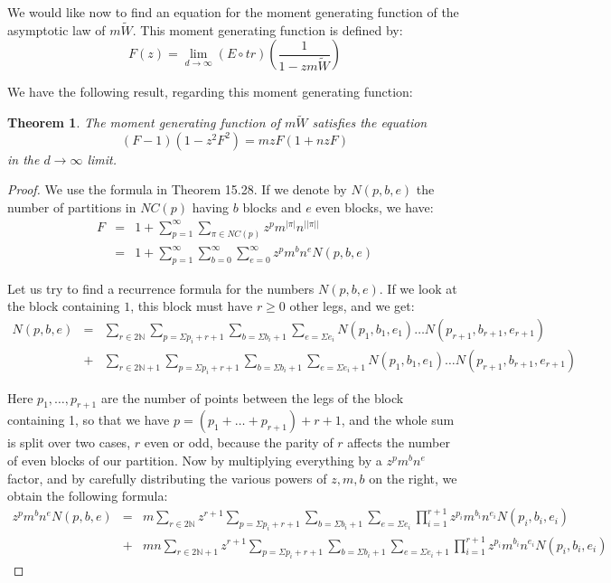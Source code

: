 \documentclass[12pt]{amsbook}
\newtheorem{theorem}{Theorem}[chapter]
\begin{document}
We would like now to find an equation for the moment generating function of the asymptotic law of $m\tilde{W}$. This moment generating function is defined by:
$$F(z)=\lim_{d\to\infty}(E\circ tr)\left(\frac{1}{1-zm\tilde{W}}\right)$$

We have the following result, regarding this moment generating function:

\begin{theorem}
The moment generating function of $m\tilde{W}$ satisfies the equation
$$(F-1)(1-z^2F^2)=mzF(1+nzF)$$
in the $d\to\infty$ limit.
\end{theorem}

\begin{proof}
We use the formula in Theorem 15.28. If we denote by $N(p,b,e)$ the number of partitions in $NC(p)$ having $b$ blocks and $e$ even blocks, we have:
\begin{eqnarray*}
F
&=&1+\sum_{p=1}^\infty\sum_{\pi\in NC(p)} z^pm^{|\pi|}n^{||\pi||}\\
&=&1+\sum_{p=1}^\infty\sum_{b=0}^\infty\sum_{e=0}^\infty z^pm^bn^eN(p,b,e)
\end{eqnarray*}

Let us try to find a recurrence formula for the numbers $N(p,b,e)$. If we look at the block containing $1$, this block must have $r\geq 0$ other legs, and we get:
\begin{eqnarray*}
N(p,b,e) 
&=&\sum_{r\in 2\mathbb N}\sum_{p=\Sigma p_i+r+1}\sum_{b=\Sigma b_i+1}\sum_{e=\Sigma e_i}N(p_1,b_1,e_1)\ldots N(p_{r+1},b_{r+1},e_{r+1})\\
&+&\sum_{r\in 2\mathbb N+1}\sum_{p=\Sigma p_i+r+1}\sum_{b=\Sigma b_i+1}\sum_{e=\Sigma e_i+1}N(p_1,b_1,e_1)\ldots N(p_{r+1},b_{r+1},e_{r+1})
\end{eqnarray*}

Here $p_1,\ldots,p_{r+1}$ are the number of points between the legs of the block containing 1, so that we have $p=(p_1+\ldots+p_{r+1})+r+1$, and the whole sum is split over two cases, $r$ even or odd, because the parity of $r$ affects the number of even blocks of our partition. Now by multiplying everything by a $z^pm^bn^e$ factor, and by carefully distributing the various powers of $z,m,b$ on the right, we obtain the following formula:
\begin{eqnarray*}
z^pm^bn^eN(p,b,e)
&=&m\sum_{r\in 2\mathbb N}z^{r+1}\sum_{p=\Sigma p_i+r+1}\sum_{b=\Sigma b_i+1}\sum_{e=\Sigma e_i}\prod_{i=1}^{r+1}z^{p_i}m^{b_i}n^{e_i}N(p_i,b_i,e_i)\\
&+&mn\sum_{r\in 2\mathbb N+1}z^{r+1}\sum_{p=\Sigma p_i+r+1}\sum_{b=\Sigma b_i+1}\sum_{e=\Sigma e_i+1}\prod_{i=1}^{r+1}z^{p_i}m^{b_i}n^{e_i}N(p_i,b_i,e_i)
\end{eqnarray*}


\end{proof}
\end{document}
